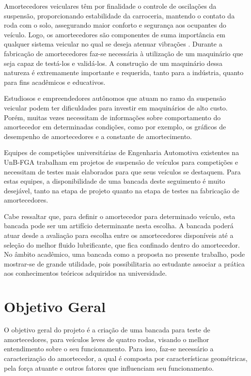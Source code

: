 		Amortecedores veiculares têm por finalidade o controle de oscilações da suspensão, proporcionando estabilidade da carroceria, mantendo o contato da roda com o solo, assegurando maior conforto e segurança aos ocupantes do veículo. Logo, os amortecedores são componentes de suma importância em qualquer sistema veicular no qual se deseja atenuar vibrações \cite{Duarte}. Durante a fabricação de amortecedores faz-se necessária à utilização de um maquinário que seja capaz de testá-los e validá-los. A construção de um maquinário dessa natureza é extremamente importante e requerida, tanto para a indústria, quanto para fins acadêmicos e educativos.

		Estudiosos e empreendedores autônomos que atuam no ramo da suspensão veicular podem ter dificuldades para investir em maquinários de alto custo. Porém, muitas vezes necessitam de informações sobre comportamento do amortecedor em determinadas condições, como por exemplo, os gráficos de desempenho de amortecedores e a constante de amortecimento.

		Equipes de competições universitárias de Engenharia Automotiva existentes na UnB-FGA trabalham em projetos de suspensão de veículos para competições e necessitam de testes mais elaborados para que seus veículos se destaquem. Para estas equipes, a disponibilidade de uma bancada deste seguimento é muito desejável, tanto na etapa de projeto quanto na etapa de testes na fabricação de amortecedores.

		Cabe ressaltar que, para definir o amortecedor para determinado veículo, esta bancada pode ser um artifício determinante nesta escolha. A bancada poderá atuar desde a avaliação para escolha entre os amortecedores disponíveis até a seleção do melhor fluido lubrificante, que fica confinado dentro do amortecedor. No âmbito acadêmico, uma bancada como a proposta no presente trabalho, pode mostrar-se de grande utilidade, pois possibilitaria ao estudante associar a prática aos conhecimentos teóricos adquiridos na universidade.

	\section{Objetivo Geral}
	\label{sec:tap_objetivo_geral}

		O objetivo geral do projeto é a criação de uma bancada para teste de amortecedores, para veículos leves de quatro rodas, visando o melhor entendimento sobre o seu funcionamento. Para isso, faz-se necessário a caracterização do amortecedor, a qual é composta por características geométricas, pela força atuante e outros fatores que influenciam seu funcionamento.

